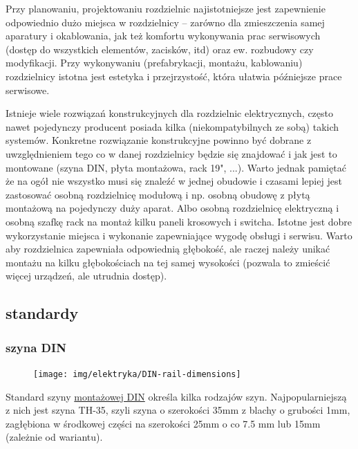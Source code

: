 Przy planowaniu, projektowaniu rozdzielnic najistotniejsze jest zapewnienie odpowiednio dużo miejsca w rozdzielnicy – zarówno dla zmieszczenia samej aparatury i okablowania, jak też komfortu wykonywania prac serwisowych (dostęp do wszystkich elementów, zacisków, itd) oraz ew. rozbudowy czy modyfikacji. Przy wykonywaniu (prefabrykacji, montażu, kablowaniu) rozdzielnicy istotna jest estetyka i przejrzystość, która ułatwia późniejsze prace serwisowe.

Istnieje wiele rozwiązań konstrukcyjnych dla rozdzielnic elektrycznych, często nawet pojedynczy producent posiada kilka (niekompatybilnych ze sobą) takich systemów.
Konkretne rozwiązanie konstrukcyjne powinno być dobrane z uwzględnieniem tego co w danej rozdzielnicy będzie się znajdować i jak jest to montowane (szyna DIN, płyta montażowa, rack 19", ...).
Warto jednak pamiętać że na ogół nie wszystko musi się znaleźć w jednej obudowie i czasami lepiej jest zastosować osobną rozdzielnicę modułową i np. osobną obudowę z płytą montażową na pojedynczy duży aparat.
Albo osobną rozdzielnicę elektryczną i osobną szafkę rack na montaż kilku paneli krosowych i switcha.
Istotne jest dobre wykorzystanie miejsca i wykonanie zapewniające wygodę obsługi i serwisu.
Warto aby rozdzielnica zapewniała odpowiednią głębokość, ale raczej należy unikać montażu na kilku głębokościach na tej samej wysokości (pozwala to zmieścić więcej urządzeń, ale utrudnia dostęp).

\subsection{standardy}

\subsubsection{szyna DIN}

\begin{figure} %
\vspace{-0.8cm}\texttt{[image: img/elektryka/DIN-rail-dimensions]}\vspace{-0.5cm} %
\end{figure}

Standard szyny \href{https://en.wikipedia.org/wiki/DIN_rail}{montażowej DIN} określa kilka rodzajów szyn.
Najpopularniejszą z nich jest szyna TH-35, szyli szyna o szerokości 35mm z blachy o grubości 1mm, zagłębiona w środkowej części na szerokości 25mm o co 7.5 mm lub 15mm (zależnie od wariantu).

